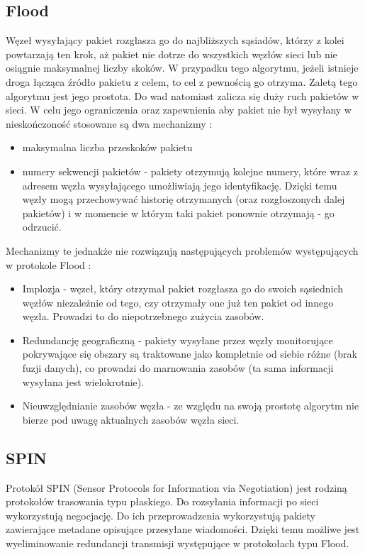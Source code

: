 \subsection{Flood}
Węzeł wysyłający pakiet rozgłasza go do najbliższych sąsiadów, którzy z kolei powtarzają ten krok, aż pakiet nie dotrze do wszystkich węzłów sieci lub nie osiągnie maksymalnej liczby skoków.
W przypadku tego algorytmu, jeżeli istnieje droga łącząca źródło pakietu z celem, to cel z pewnością go otrzyma.
Zaletą tego algorytmu jest jego prostota. Do wad natomiast zalicza się duży ruch pakietów w sieci. W celu jego ograniczenia oraz zapewnienia aby pakiet nie był wysyłany w nieskończoność stosowane są dwa mechanizmy \cite{Dargie2010}:
\begin{itemize}
	\item maksymalna liczba przeskoków pakietu
	\item numery sekwencji pakietów - pakiety otrzymują kolejne numery, które wraz z adresem węzła wysyłającego umożliwiają jego identyfikację. Dzięki temu węzły mogą przechowywać historię otrzymanych (oraz rozgłoszonych dalej pakietów) i w momencie w którym taki pakiet ponownie otrzymają - go odrzucić.
\end{itemize}

Mechanizmy te jednakże nie rozwiązują następujących problemów występujących w protokole Flood \cite{Dargie2010}:
\begin{itemize}
	\item Implozja - węzeł, który otrzymał pakiet rozgłasza go do swoich sąsiednich węzłów niezależnie od tego, czy otrzymały one już ten pakiet od innego węzła. Prowadzi to do niepotrzebnego zużycia zasobów. %
	\item Redundancję geograficzną - pakiety wysyłane przez węzły monitorujące pokrywające się obszary są traktowane jako kompletnie od siebie różne (brak fuzji danych), co prowadzi do marnowania zasobów (ta sama informacji wysyłana jest wielokrotnie). %
	\item Nieuwzględnianie zasobów węzła - ze względu na swoją prostotę algorytm nie bierze pod uwagę aktualnych zasobów węzła sieci.
\end{itemize}
\subsection{SPIN}
Protokół SPIN (Sensor Protocols for Information via Negotiation) jest rodziną protokołów trasowania typu płaskiego. Do rozsyłania informacji po sieci wykorzystują negocjację. Do ich przeprowadzenia wykorzystują pakiety zawierające metadane opisujące przesyłane wiadomości. Dzięki temu możliwe jest wyeliminowanie redundancji transmisji występujące w protokołach typu Flood.

